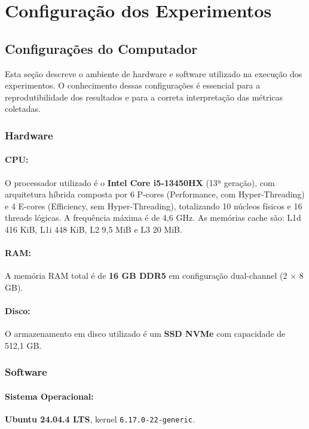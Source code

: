 \section{Configuração dos Experimentos}

\subsection{Configurações do Computador}

Esta seção descreve o ambiente de hardware e software utilizado na execução
dos experimentos. O conhecimento dessas configurações é essencial para a
reprodutibilidade dos resultados e para a correta interpretação das métricas
coletadas.

\subsubsection{Hardware}

\paragraph{CPU:}
O processador utilizado é o \textbf{Intel Core i5-13450HX} (13ª geração), com
arquitetura híbrida composta por 6 P-cores (Performance, com Hyper-Threading)
e 4 E-cores (Efficiency, sem Hyper-Threading), totalizando 10 núcleos físicos
e 16 threads lógicas. A frequência máxima é de 4,6 GHz. As memórias cache são:
L1d 416 KiB, L1i 448 KiB, L2 9,5 MiB e L3 20 MiB.

\paragraph{RAM:}
A memória RAM total é de \textbf{16 GB DDR5} em configuração dual-channel
(2 $\times$ 8 GB).

\paragraph{Disco:}
O armazenamento em disco utilizado é um \textbf{SSD NVMe} com capacidade de
512,1 GB.

\subsubsection{Software}

\paragraph{Sistema Operacional:}
\textbf{Ubuntu 24.04.4 LTS}, kernel \texttt{6.17.0-22-generic}.

